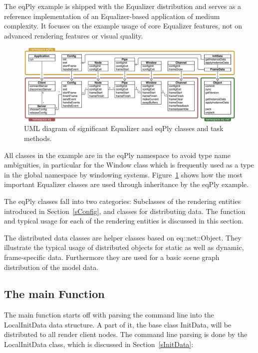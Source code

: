 \documentclass[10pt,a4]{scrartcl}
\newcommand{\fig}[1]{Figure~\ref{#1}}
\newcommand{\sref}[1]{Section~\ref{#1}}
\begin{document}
The \textsf{eqPly} example is shipped with the Equalizer distribution
and serves as a reference implementation of an Equalizer-based
application of medium complexity. It focuses on the example usage of
core Equalizer features, not on advanced rendering features or visual
quality.

\begin{figure}[ht!]\center
  \includegraphics[width=\textwidth]{images/uml}
  {\caption{\small\label{fUml}UML diagram of significant Equalizer and
      eqPly classes and task methods.}}
\end{figure}

All classes in the example are in the \textsf{eqPly} namespace to avoid
type name ambiguities, in particular for the \textsf{Window} class which
is frequently used as a type in the global namespace by windowing
systems. \fig{fUml} shows how the most important Equalizer classes are
used through inheritance by the \textsf{eqPly} example.

The \textsf{eqPly} classes fall into two categories: Subclasses of the
rendering entities introduced in \sref{sConfig}, and classes for
distributing data. The function and typical usage for each of the
rendering entities is discussed in this section.

The distributed data classes are helper classes based on
\textsf{eq::net::Object}. They illustrate the typical usage of distributed
objects for static as well as dynamic, frame-specific data. Furthermore
they are used for a basic scene graph distribution of the model data.


\subsection{The main Function}

The main function starts off with parsing the command line into the
\textsf{LocalInitData} data structure. A part of it, the base class
\textsf{InitData}, will be distributed to all render client nodes. The
command line parsing is done by the \textsf{LocalInitData} class, which
is discussed in \sref{sInitData}:
\end{document}
